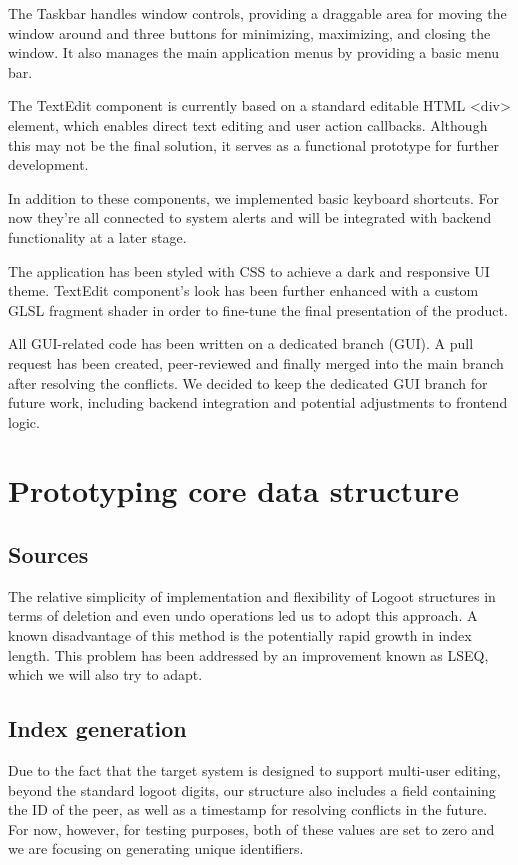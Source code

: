 \documentclass[12pt]{article}
\begin{document}
The Taskbar handles window controls, providing a draggable area for moving the window around and three 
buttons for minimizing, maximizing, and closing the window. It also manages the main application menus
by providing a basic menu bar. 

The TextEdit component is currently based on a standard editable HTML <div> element, which enables 
direct text editing and user action callbacks. Although this may not be the final solution, it serves 
as a functional prototype for further development.

In addition to these components, we implemented basic keyboard shortcuts. For now they're all connected 
to system alerts and will be integrated with backend functionality at a later stage.

The application has been styled with CSS to achieve a dark and responsive UI theme. TextEdit component's
look has been further enhanced with a custom GLSL fragment shader in order to fine-tune the final presentation
of the product.

All GUI-related code has been written on a dedicated branch (GUI). A pull request has been created, 
peer-reviewed and finally merged into the main branch after resolving the conflicts. We decided to keep 
the dedicated GUI branch for future work, including backend integration and potential adjustments to 
frontend logic.

\section{Prototyping core data structure}

\subsection{Sources}

The relative simplicity of implementation and flexibility of Logoot\cite{logoot} structures in terms of deletion and even undo operations led us to adopt this approach. A known disadvantage of this method is the potentially rapid growth in index length. This problem has been addressed by an improvement known as LSEQ\cite{lseq}, which we will also try to adapt.

\subsection{Index generation}

Due to the fact that the target system is designed to support multi-user editing, beyond the standard logoot digits, our structure also includes a field containing the ID of the peer, as well as a timestamp for resolving conflicts in the future. For now, however, for testing purposes, both of these values are set to zero and we are focusing on generating unique identifiers. 
\end{document}

